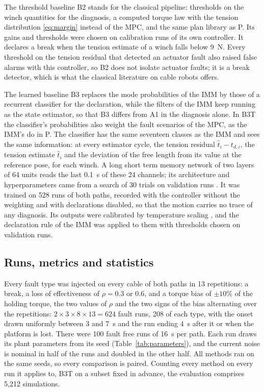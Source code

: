 \documentclass{interact}
\begin{document}


The threshold baseline B2 stands for the classical pipeline: thresholds on the winch quantities for the diagnosis, a computed torque law with the tension distribution \eqref{eq:margin} instead of the MPC, and the same plan library as P. Its gains and thresholds were chosen on calibration runs of its own controller. It declares a break when the tension estimate of a winch falls below 9~N. Every threshold on the tension residual that detected an actuator fault also raised false alarms with this controller, so B2 does not isolate actuator faults; it is a break detector, which is what the classical literature on cable robots offers.

The learned baseline B3 replaces the mode probabilities of the IMM by those of a recurrent classifier for the declaration, while the filters of the IMM keep running as the state estimator, so that B3 differs from A1 in the diagnosis alone. In B3T the classifier's probabilities also weight the fault scenarios of the MPC, as the IMM's do in P. The classifier has the same seventeen classes as the IMM and sees the same information: at every estimator cycle, the tension residual $\hat t_i-t_{d,i}$, the tension estimate $\hat t_i$ and the deviation of the free length from its value at the reference pose, for each winch. A long short term memory network \citep{hochreiter1997lstm} of two layers of 64 units reads the last 0.1~s of these 24 channels; its architecture and hyperparameters came from a search of 30 trials on validation runs \citep{akiba2019optuna}. It was trained on 528 runs of both paths, recorded with the controller without the weighting and with declarations disabled, so that the motion carries no trace of any diagnosis. Its outputs were calibrated by temperature scaling \citep{guo2017calibration}, and the declaration rule of the IMM was applied to them with thresholds chosen on validation runs.

\subsection{Runs, metrics and statistics}\label{sec:protocol}

Every fault type was injected on every cable of both paths in 13 repetitions: a break, a loss of effectiveness of $\rho=0.3$ or 0.6, and a torque bias of $\pm10\%$ of the holding torque, the two values of $\rho$ and the two signs of the bias alternating over the repetitions: $2\times3\times8\times13=624$ fault runs, 208 of each type, with the onset drawn uniformly between 3 and 7~s and the run ending 4~s after it or when the platform is lost. There were 100 fault free runs of 16~s per path. Each run draws its plant parameters from its seed (Table~\ref{tab:parameters}), and the current noise is nominal in half of the runs and doubled in the other half. All methods ran on the same seeds, so every comparison is paired. Counting every method on every run it applies to, B3T on a subset fixed in advance, the evaluation comprises 5,212 simulations.
\end{document}
